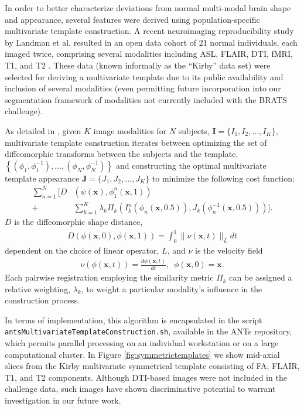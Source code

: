 \documentclass[final,5p,times,twocolumn]{elsarticle}
\begin{document}
In order to better characterize deviations from normal
multi-modal brain shape and appearance, several features were derived 
using population-specific multivariate template 
construction. A recent neuroimaging reproducibility study
by Landman et al. resulted in an open data cohort of 21
normal individuals, each imaged twice, comprising several
modalities including ASL, FLAIR, DTI, fMRI, T1, and T2 
\cite{landman2011}.  These data (known informally as the
``Kirby'' data set) were selected for deriving
a multivariate template due to its public availability and
inclusion of several modalities (even permitting future 
incorporation into our segmentation framework of modalities 
not currently included with the BRATS challenge).

As detailed in \cite{avants2008,avants2010}, 
given $K$ image modalities for $N$ subjects,  
${\mathbf I} = \{I_1,I_2,\ldots, I_K\}$, multivariate 
template construction iterates between optimizing the set 
of diffeomorphic transforms between the subjects and the 
template, 
$\left\{\left(\phi_1,\phi_1^{-1}\right),\ldots,\left(\phi_N,\phi_N^{-1}\right)\right\}$ 
and constructing the 
optimal multivariate template appearance 
$\mathbf{J}=\{J_1,J_2,\ldots, J_K\}$ to minimize the
following cost function:
\begin{align}
  \sum_{n=1}^N 
        \Bigg[ D &\left( \psi(\mathbf{x}),\phi_1^n(\mathbf{x},1)\right) \\ \nonumber 
        +& \sum_{k=1}^K \lambda_k \Pi_k \left(I_k^n\left(\phi_n(\mathbf{x},0.5)\right),J_k\left(\phi^{-1}_n(\mathbf{x},0.5)\right)\right)\Bigg].
\end{align}
$D$ is the diffeomorphic shape distance,
\begin{align}
D\left( \phi( \mathbf{x},0),\phi( \mathbf{x},1)\right) = \int_0^1 \| \nu(\mathbf{x},t)\|_L dt
\end{align}
dependent on the choice of linear operator, $L$, and $\nu$
is the velocity field
\begin{align}
\nu\left( \phi(\mathbf{x},t) \right) = \frac{d\phi(\mathbf{x},t)}{dt},\,\,\, \phi(\mathbf{x},0) = \mathbf{x}.
\end{align}
Each pairwise registration employing the similarity metric $\Pi_k$ can 
be assigned a relative weighting, $\lambda_k$, to weight a particular
modality's influence in the construction process.  

In terms of implementation, this algorithm is 
encapsulated in the script \verb#antsMultivariateTemplateConstruction.sh#,
available in the ANTs repository, which permits parallel processing on
an individual workstation or on a large computational cluster.  In
Figure \ref{fig:symmetrictemplates} we show mid-axial slices from
the Kirby multivariate symmetrical template consisting of FA, FLAIR,  
T1, and T2 components.  Although DTI-based images were not included in the
challenge data, such images have shown discriminative potential 
\citep{price2003} to warrant investigation in our future work.
\end{document}
